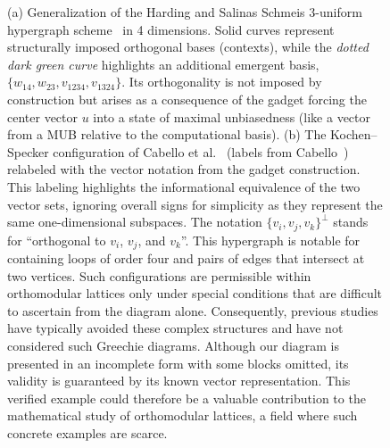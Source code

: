 \documentclass[%
  reprint,
  superscriptaddress,
  showpacs,
  showkeys,
  amsmath,amssymb,
  pra,
  longbibliography,
  floatfix,
  x11names
]{revtex4-2}
\begin{document}
\begin{figure}[ht]
\begin{tabular}{ccc}
\end{tabular}
\caption{
(a)
Generalization of the Harding and Salinas Schmeis 3-uniform hypergraph scheme~\cite{harding2025remarksIJTP} in 4 dimensions.
Solid curves represent structurally imposed orthogonal bases (contexts),
while the \textit{dotted dark green curve} highlights an additional  emergent  basis,
$\{w_{14}, w_{23}, v_{1234}, v_{1324}\}$. Its orthogonality is not imposed by construction
but arises as a consequence of the gadget forcing the center vector $u$
into a state of maximal unbiasedness (like a vector from a MUB relative to the computational basis).
(b)
The Kochen--Specker configuration of Cabello et al.~\cite{cabello-96} (labels from Cabello~\cite{cabello:210401})
relabeled with the vector notation from the gadget construction.
 This labeling highlights the informational equivalence of the two vector sets,
ignoring overall signs for simplicity as they represent the same one-dimensional subspaces.
The notation
$\{v_{i}, v_{j}, v_{k}\}^\perp$ stands for ``orthogonal to $v_{i}$, $v_{j}$, and $v_{k}$''.
This hypergraph is notable for containing loops of order four and pairs of edges that intersect at two vertices. Such configurations are permissible within orthomodular lattices only under special conditions that are difficult to ascertain from the diagram alone. Consequently, previous studies have typically avoided these complex structures and have not considered such Greechie diagrams. Although our diagram is presented in an incomplete form with some blocks omitted, its validity is guaranteed by its known vector representation. This verified example could therefore be a valuable contribution to the mathematical study of orthomodular lattices, a field where such concrete examples are scarce.
}
\label{fig:peres}
\end{figure}
\end{document}
